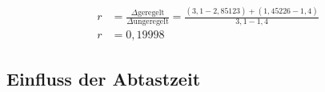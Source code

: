 \documentclass{report}
\begin{document}
\begin{align*}
	r & = \frac{\Delta \mathrm{geregelt}}{\Delta \mathrm{ungeregelt}}=\frac{(3,1-2,85123)+(1,45226-1,4)}{3,1-1,4} \\
	r & = 0,19998
\end{align*}


\subsection{Einfluss der Abtastzeit}
\end{document}
